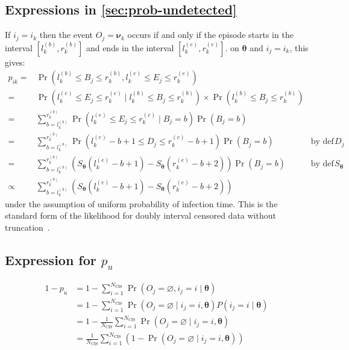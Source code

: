 \documentclass[referee,useAMS,usenatbib]{biom}
\DeclareMathOperator{\prob}{\mathrm{Pr}}
\renewcommand{\vec}[1]{\bm{#1}}
\newcommand{\Ncis}{N_\text{CIS}}
\begin{document}
\subsection{Expressions in \cref{sec:prob-undetected}}

If $i_j = i_k$ then the event $O_j = \vec{\nu}_k$ occurs if and only if the episode starts in the interval $[l^{(b)}_k, r^{(b)}_k]$ and ends in the interval $[l^{(e)}_k, r^{(e)}_k]$.
 on $\vec{\theta}$ and $i_j = i_k$, this gives:
\begin{align}
p_{ik}
=& \prob \left( l_k^{(b)} \leq B_{j} \leq r_k^{(b)}, l_k^{(e)} \leq E_{j} \leq r_k^{(e)} \right) \\
=& \prob \left( l_k^{(e)} \leq E_{j} \leq r_k^{(e)} \mid l_k^{(b)} \leq B_{j} \leq r_k^{(b)} \right) \times\prob \left( l_k^{(b)} \leq B_{j} \leq r_k^{(b)} \right) \\
=& \sum_{b = l_k^{(b)}}^{r_k^{(b)}} \prob \left( l_k^{(e)} \leq E_{j} \leq r_k^{(e)} \mid B_{j} = b \right) \prob \left(B_{j} = b \right) \\
=& \sum_{b = l_k^{(b)}}^{r_k^{(b)}} \prob \left( l_k^{(e)} - b + 1 \leq D_{j} \leq r_k^{(e)} - b + 1 \right) \prob \left(B_{j} = b \right) &\text{by def of $D_{j}$} \\
=& \sum_{b = l_k^{(b)}}^{r_k^{(b)}} \left( S_{\vec{\theta}}(l_k^{(e)} - b + 1) - S_{\vec{\theta}}(r_k^{(e)} - b + 2) \right) \prob \left(B_{j} = b \right) &\text{by def of $S_{\vec{\theta}}$} \\
\propto& \sum_{b = l_k^{(b)}}^{r_k^{(b)}} \left( S_{\vec{\theta}}(l_k^{(e)} - b + 1) - S_{\vec{\theta}}(r_k^{(e)} - b + 2) \right)
\end{align}
under the assumption of uniform probability of infection time.
This is the standard form of the likelihood for doubly interval censored data without truncation~\citep[e.g.][]{sunEmpirical}.

\subsection{Expression for $p_{u}$}

\begin{align}
  1 - p_u
  &= 1 - \sum_{i=1}^{\Ncis} \prob(O_j = \varnothing, i_j = i \mid \vec{\theta}) \\
  &= 1 - \sum_{i=1}^{\Ncis} \prob(O_j = \varnothing \mid i_j = i, \vec{\theta}) P(i_j = i \mid \vec{\theta}) \\
  &= 1 - \frac{1}{\Ncis}\sum_{i=1}^{\Ncis} \prob(O_j = \varnothing \mid i_j = i, \vec{\theta}) \\
  &= \frac{1}{\Ncis} \sum_{i=1}^{\Ncis} (1 - \prob(O_j = \varnothing \mid i_j = i, \vec{\theta}))
\end{align}
\end{document}

